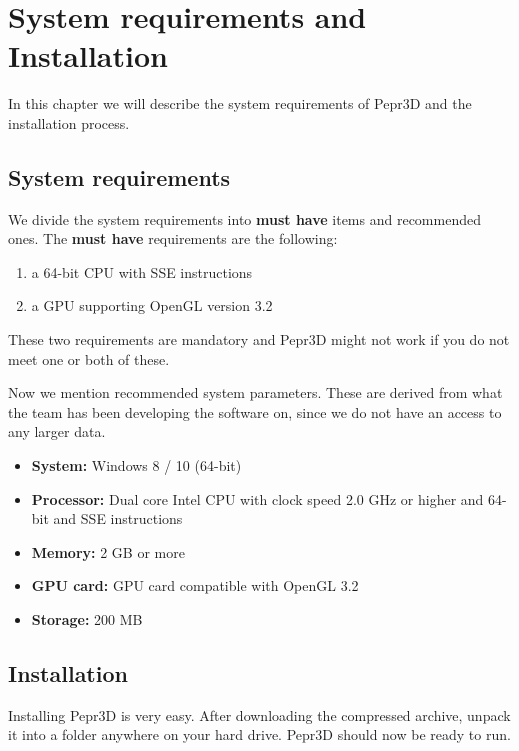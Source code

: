 \chapter{System requirements and Installation}

In this chapter we will describe the system requirements of Pepr3D and the installation process.

\section{System requirements}

We divide the system requirements into \textbf{must have} items and recommended ones. The \textbf{must have} requirements are the following:

\begin{enumerate}
\item a 64-bit CPU with SSE instructions
\item a GPU supporting OpenGL version 3.2
\end{enumerate}

These two requirements are mandatory and Pepr3D might not work if you do not meet one or both of these.

Now we mention recommended system parameters. These are derived from what the team has been developing the software on, since we do not have an access to any larger data.

\begin{itemize}
\item \textbf{System:} Windows 8 / 10 (64-bit)
\item \textbf{Processor:} Dual core Intel CPU with clock speed 2.0 GHz or higher and 64-bit and SSE instructions
\item \textbf{Memory:} 2 GB or more
\item \textbf{GPU card:} GPU card compatible with OpenGL 3.2
\item \textbf{Storage:} 200 MB
\end{itemize}

\section{Installation}

Installing Pepr3D is very easy. After downloading the compressed archive, unpack it into a folder anywhere on your hard drive. Pepr3D should now be ready to run.